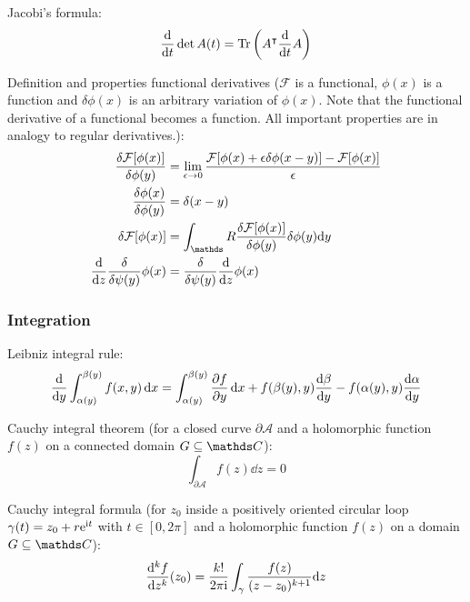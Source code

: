 			\noindent
			Jacobi's formula:
			\begin{equation}
				\dv{t}\det A(t) = \Tr \qty(A^\intercal \dv{t} A)
			\end{equation}

			\noindent
			Definition and properties functional derivatives ($\mathcal{F}$ is a functional, $\phi(x)$ is a function and $\delta \phi(x)$ is an arbitrary variation of $\phi(x)$. Note that the functional derivative of a functional becomes a function. All important properties are in analogy to regular derivatives.):
			\begin{equation}
				\begin{aligned}
					\fdv{\mathcal{F}\qty[\phi(x)]}{\phi(y)} &= \lim_{\epsilon \to 0} \frac{	\mathcal{F}\qty[\phi(x) + \epsilon\delta\phi(x-y)] - \mathcal{F}\qty[\phi(x)]}{\epsilon} \\
					\frac{\delta \phi(x)}{\delta \phi(y)} &= \delta(x-y) \\
					\delta \mathcal{F}\qty[\phi(x)] &= \int_\reals \frac{\delta \mathcal{F}\qty[\phi(x)]}{\delta \phi(y)}\delta\phi(y)\dd y \\
					\dv{z} \fdv{\psi(y)} \phi(x) &= \fdv{\psi(y)} \dv{z} \phi(x) \\
				\end{aligned}
			\end{equation}

		\subsubsection{Integration}
			\noindent
			Leibniz integral rule:
			\begin{equation}
				\dv{y} \int_{\alpha(y)}^{\beta(y)}f(x,y)\dd{x} = \int_{\alpha(y)}^{\beta(y)} \pdv{f}{y}(x,y)\dd{x} + f(\beta(y),y)\dv{\beta}{y}(y)-f(\alpha(y),y)\dv{\alpha}{y}(y)
			\end{equation}

			\noindent
			Cauchy integral theorem (for a closed curve $\partial \mathcal{A}$ and a holomorphic function $f(z)$ on a connected domain $G \subseteq \complex $):
			\begin{equation}
				\int_{\partial \mathcal{A}} f(z)\dd z = 0
			\end{equation}

			\noindent
			Cauchy integral formula (for $z_0$ inside a positively oriented circular loop $\gamma(t)=z_0+r\mathrm{e}^{\mathrm{i} t}$ with $t\in[0,2\pi]$ and a holomorphic function $f(z)$ on a domain $G \subseteq \complex $):
			\begin{equation}
				\dv[k]{f}{z} \qty(z_0) = \frac{k!}{2\pi \mathrm{i}} \int_\gamma \frac{f(z)}{(z-z_0)^{k+1}}\dd z
			\end{equation}

